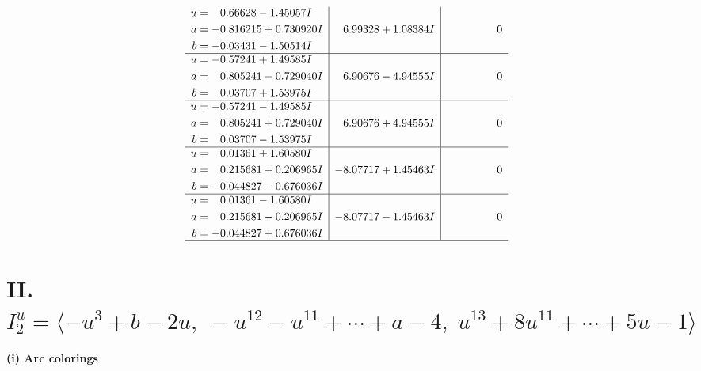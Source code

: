 \documentclass[1p]{elsarticle_modified}
\theoremstyle{definition}
\begin{document}
$$\begin{array}{c|c|c}
\begin{aligned}
u &= \phantom{-}0.66628 - 1.45057 I \\
a &= -0.816215 + 0.730920 I \\
b &= -0.03431 - 1.50514 I\end{aligned}
 & \phantom{-}6.99328 + 1.08384 I & \phantom{-0.000000 } 0 \\ \hline\begin{aligned}
u &= -0.57241 + 1.49585 I \\
a &= \phantom{-}0.805241 - 0.729040 I \\
b &= \phantom{-}0.03707 + 1.53975 I\end{aligned}
 & \phantom{-}6.90676 - 4.94555 I & \phantom{-0.000000 } 0 \\ \hline\begin{aligned}
u &= -0.57241 - 1.49585 I \\
a &= \phantom{-}0.805241 + 0.729040 I \\
b &= \phantom{-}0.03707 - 1.53975 I\end{aligned}
 & \phantom{-}6.90676 + 4.94555 I & \phantom{-0.000000 } 0 \\ \hline\begin{aligned}
u &= \phantom{-}0.01361 + 1.60580 I \\
a &= \phantom{-}0.215681 + 0.206965 I \\
b &= -0.044827 - 0.676036 I\end{aligned}
 & -8.07717 + 1.45463 I & \phantom{-0.000000 } 0 \\ \hline\begin{aligned}
u &= \phantom{-}0.01361 - 1.60580 I \\
a &= \phantom{-}0.215681 - 0.206965 I \\
b &= -0.044827 + 0.676036 I\end{aligned}
 & -8.07717 - 1.45463 I & \phantom{-0.000000 } 0\\
 \hline 
 \end{array}$$\newpage\newpage\renewcommand{\arraystretch}{1}
\centering \section*{II. $I^u_{2}= \langle - u^3+b-2 u,\;- u^{12}- u^{11}+\cdots+a-4,\;u^{13}+8 u^{11}+\cdots+5 u-1 \rangle$}
\flushleft \textbf{(i) Arc colorings}\\
\end{document}
